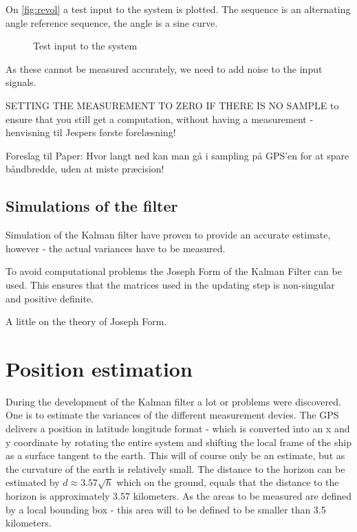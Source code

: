 On \vref{fig:revol} a test input to the system is plotted. The sequence is an alternating angle reference sequence, the angle is a sine curve. 
\begin{figure}[htbp]
	\centering
	\caption{Test input to the system}
	\label{fig:revol}
\end{figure}

As these cannot be measured accurately, we need to add noise to the input signals.

SETTING THE MEASUREMENT TO ZERO IF THERE IS NO SAMPLE to ensure that you still get a computation, without having a measurement - henvisning til Jespers første forelæsning!

Foreslag til Paper: Hvor langt ned kan man gå i sampling på GPS'en for at spare båndbredde, uden at miste præcision!

\subsection{Simulations of the filter}
Simulation of the Kalman filter have proven to provide an accurate estimate, however - the actual variances have to be measured. 

To avoid computational problems the Joseph Form of the Kalman Filter can be used. This ensures that the matrices used in the updating step is non-singular and positive definite. 

A little on the theory of Joseph Form.

\section{Position estimation}
During the development of the Kalman filter a lot or problems were discovered. One is to estimate the variances of the different measurement devies. The GPS delivers a position in latitude longitude format - which is converted into an x and y coordinate by rotating the entire system and shifting the local frame of the ship as a surface tangent to the earth. This will of course only be an estimate, but as the curvature of the earth is relatively small. The distance to the horizon can be estimated by $d \approx 3.57\sqrt{h}$ which on the ground, equals that the distance to the horizon is approximately 3.57 kilometers. As the areas to be measured are defined by a local bounding box - this area will to be defined to be smaller than 3.5 kilometers.

